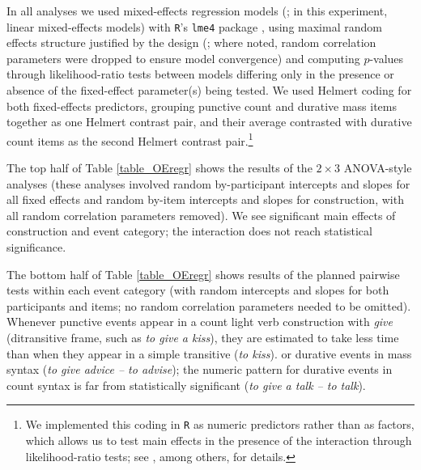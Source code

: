 \documentclass[review,12pt,authoryear]{elsarticle}
\begin{document}
In all analyses we used mixed-effects regression models (\citealp{baayen2008mixed}; in this experiment, linear mixed-effects models)  with \texttt{R}'s \texttt{lme4} package \citep{bates2014package}, using maximal random effects structure justified by the design (\citealp{barr2013}; where noted, random correlation parameters were dropped to ensure model convergence) and computing $p$-values through likelihood-ratio tests between models differing only in the presence or absence of the fixed-effect parameter(s) being tested. We used Helmert coding for both fixed-effects predictors, grouping punctive count and durative mass items together as one Helmert contrast pair, and their average contrasted with durative count items as the second Helmert contrast pair.\footnote{We implemented this coding in \texttt{R} as numeric predictors rather than as factors, which allows us to test main effects in the presence of the interaction through likelihood-ratio tests; see \citet{levy2014mainEffects}, among others, for details.}  

The top half of Table \ref{table_OEregr} shows the results of the $2\times 3$ ANOVA-style analyses (these analyses involved random by-participant intercepts and slopes for all fixed effects and random by-item intercepts and slopes for construction, with all random correlation parameters removed).  We see significant main effects of construction and event category; the interaction does not reach statistical significance.

The bottom half of Table \ref{table_OEregr} shows results of the planned pairwise tests within each event category (with random intercepts and slopes for both participants and items; no random correlation parameters needed to be omitted). Whenever punctive events appear in a count light verb construction with \emph{give} (ditransitive frame, such as\emph{ to give a kiss}), they are estimated to take  less time than when they appear in a simple transitive (\emph{to kiss}).  or durative events in mass syntax (\emph{to give advice -- to advise}); the numeric pattern for durative events in count syntax is far from statistically significant (\emph{to give a talk -- to talk}).
\end{document}
